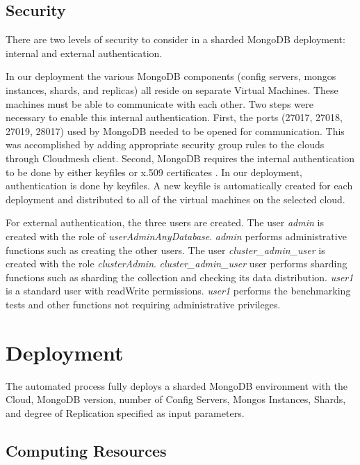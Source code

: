 \documentclass[9pt,twocolumn,twoside]{../../styles/osajnl}
\begin{document}
\subsection{Security}

There are two levels of security to consider in a sharded MongoDB deployment: internal and external authentication.

In our deployment the various MongoDB components (config servers, mongos instances, shards, and replicas) all reside on separate Virtual Machines.  These machines must be able to communicate with each other.  Two steps were necessary to enable this internal authentication.  First, the ports (27017, 27018, 27019, 28017) used by MongoDB needed to be opened for communication.  This was accomplished by adding appropriate security group rules to the clouds through Cloudmesh client.  Second, MongoDB requires the internal authentication to be done by either keyfiles or x.509 certificates  \cite{www-mongoAuth}.  In our deployment, authentication is done by keyfiles.  A new keyfile is automatically created for each deployment and distributed to all of the virtual machines on the selected cloud.

For external authentication, the three users are created.  The user \emph{admin} is created with the role of \emph{userAdminAnyDatabase}.  \emph{admin} performs administrative functions such as creating the other users.  The user \emph{cluster\_admin\_user} is created with the role \emph{clusterAdmin}. \emph{cluster\_admin\_user} user performs sharding functions such as sharding the collection and checking its data distribution. \emph{user1} is a standard user with readWrite permissions.  \emph{user1} performs the benchmarking tests and other functions not requiring administrative privileges.



\section{Deployment}


The automated process fully deploys a sharded MongoDB environment with the Cloud, MongoDB version, number of Config Servers, Mongos Instances, Shards, and degree of Replication specified as input parameters.

\subsection{Computing Resources}
\end{document}
